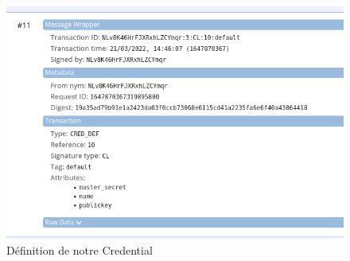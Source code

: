 \documentclass[12pt, openany]{report}
\begin{document}
\begin{flushleft}
\begin{figure}[H]
	\includegraphics[scale=0.5]{cred_def.png}
	\centering
	\caption{Définition de notre Credential}
\end{figure}

\end{flushleft}
\end{document}
